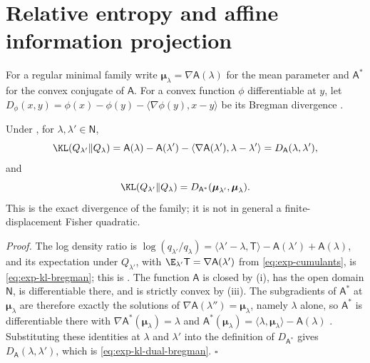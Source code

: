 \section{Relative entropy and affine information projection}
\label{sec:exp-information-projection}

For a regular minimal family write
\(\boldsymbol\mu_\lambda=\nabla\mathsf A(\lambda)\) for the mean parameter and
\(\mathsf A^\ast\) for the convex conjugate of \(\mathsf A\). For a convex
function \(\phi\) differentiable at \(y\), let
\(D_\phi(x,y)=\phi(x)-\phi(y)-\langle\nabla\phi(y),x-y\rangle\) be its Bregman
divergence \citep{Bregman1967}.

Under , for \(\lambda,\lambda'\in\mathsf N\),
\begin{equation}
\KL(Q_{\lambda'}\Vert Q_\lambda)
=\mathsf A(\lambda)-\mathsf A(\lambda')
-\langle\nabla\mathsf A(\lambda'),\lambda-\lambda'\rangle
=D_{\mathsf A}(\lambda,\lambda'),
\label{eq:exp-kl-bregman}
\end{equation}
and
\begin{equation}
\KL(Q_{\lambda'}\Vert Q_\lambda)
=D_{\mathsf A^\ast}(\boldsymbol\mu_{\lambda'},\boldsymbol\mu_\lambda).
\label{eq:exp-kl-dual-bregman}
\end{equation}
This is the exact divergence of the family; it is not in general a
finite-displacement Fisher quadratic. 

\noindent\emph{Proof.}
The log density ratio is
\(\log(q_{\lambda'}/q_\lambda)=\langle\lambda'-\lambda,\mathsf T\rangle
-\mathsf A(\lambda')+\mathsf A(\lambda)\), and its expectation under
\(Q_{\lambda'}\), with \(\E_{\lambda'}\mathsf T=\nabla\mathsf A(\lambda')\)
from \eqref{eq:exp-cumulants}, is \eqref{eq:exp-kl-bregman}; this is
\citet[Proposition~6.3]{Brown1986}. The function \(\mathsf A\) is closed by
(i), has the open domain \(\mathsf N\), is
differentiable there, and is strictly convex by
(iii). The subgradients of \(\mathsf A^\ast\)
at \(\boldsymbol\mu_\lambda\) are therefore exactly the solutions of
\(\nabla\mathsf A(\lambda'')=\boldsymbol\mu_\lambda\), namely \(\lambda\)
alone, so \(\mathsf A^\ast\) is differentiable there with
\(\nabla\mathsf A^\ast(\boldsymbol\mu_\lambda)=\lambda\) and
\(\mathsf A^\ast(\boldsymbol\mu_\lambda)=\langle\lambda,\boldsymbol\mu_\lambda\rangle
-\mathsf A(\lambda)\) \citep[Theorems~23.5 and~25.1]{Rockafellar1970}.
Substituting these identities at \(\lambda\) and \(\lambda'\) into the
definition of \(D_{\mathsf A^\ast}\) gives \(D_{\mathsf A}(\lambda,\lambda')\),
which is \eqref{eq:exp-kl-dual-bregman}. \(\square\)

